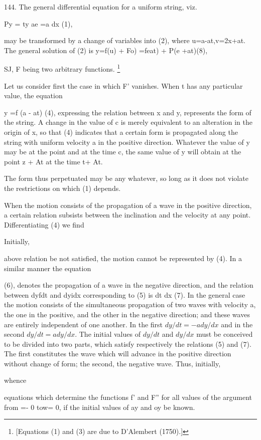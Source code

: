 144. The general differential equation for a uniform string, viz.

Py = ty ae =a dx (1),

may be transformed by a change of variables into (2),
where u=a-at,v=2x+at. The general solution of (2) is
y=f(u) + Fo) =feat) + P(e +at)(8),

SJ, F being two arbitrary functions.
\footnote{[Equations (1) and (3) are due to D'Alembert (1750).]}

Let us consider first the case in which F' vanishes. When t has any
particular value, the equation

y =f (a - at) (4),
expressing the relation between x and y, represents the form of the
string. A change in the value of c is merely equivalent to an alteration
in the origin of x, so that (4) indicates that a certain form is
propagated along the string with uniform velocity a in the positive
direction. Whatever the value of y may be at the point and at the time
c, the same value of y will obtain at the point z + At at the time t+
At.

The form thus perpetuated may be any whatever, so long as it does not
violate the restrictions on which (1) depends.

When the motion consists of the propagation of a wave in the positive
direction, a certain relation subsists between the inclination and the
velocity at any point. Differentiating (4) we find

Initially,

above relation be not satisfied, the motion cannot be represented by
(4). In a similar manner the equation

(6),
denotes the propagation of a wave in the negative direction, and the
relation between dyfdt and dyidx corresponding to (5) is
dt dx (7).
In the general case the motion consists of the simultaneous propagation
of two waves with velocity a, the one in the positive,
and the other in the negative direction; and these waves are
entirely independent of one another. In the first
\( dy/dt = - a dy/dx \)
and in the second
\( dy/dt = a dy/dx \).
The initial values of \( dy/dt\) and \( dy /dx\)  must be
conceived to be divided into two parts, which satisfy respectively the
relations (5) and (7). The first constitutes the wave which will advance
in the positive direction without change of form; the second, the
negative wave. Thus, initially,

whence

equations which determine the functions f' and F'' for all values of the
argument from =- 0 tow= 0, if the initial values of ay and oy be known.

